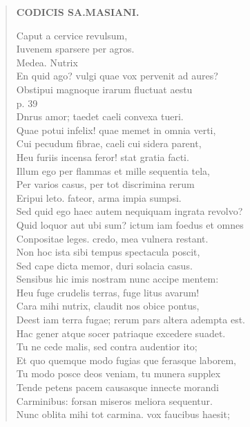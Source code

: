 \documentclass[11pt, a4paper]{report}
\begin{document}
\begin{verse}
    \begin{center} \textbf{CODICIS SA.MASIANI.} \end{center} \marginpar{[67]} Caput a cervice revulsum, \\ Iuvenem sparsere per agros. \\ Medea. Nutrix \\ En quid ago? vulgi quae vox pervenit ad aures? \\ Obstipui magnoque irarum fluctuat aestu \\ p. 39 \\ Dnrus amor; taedet caeli convexa tueri. \\ Quae potui infelix! quae memet in omnia verti, \\ Cui pecudum fibrae, caeli cui sidera parent, \\ Heu furiis incensa feror! stat gratia facti. \\ Illum ego per flammas et mille sequentia tela, \\ Per varios casus, per tot discrimina rerum \\ Eripui leto. fateor, arma impia sumpsi. \\ Sed quid ego haec autem nequiquam ingrata revolvo? \\ Quid loquor aut ubi sum? ictum iam foedus et omnes \\ Conpositae leges. credo, mea vulnera restant. \\ Non hoc ista sibi tempus spectacula poscit, \\ Sed cape dicta memor, duri solacia casus. \\ Sensibus hic imis nostram nunc accipe mentem: \\ Heu fuge crudelis terras, fuge litus avarum! \\ Cara mihi nutrix, claudit nos obice pontus, \\ Deest iam terra fugae; rerum pars altera adempta est. \\ Hac gener atque socer patriaque excedere suadet. \\ Tu ne cede malis, sed contra audentior ito; \\ Et quo quemque modo fugias \lbrack que \rbrack  ferasque laborem, \\ Tu modo posce deos veniam, tu munera supplex \\ Tende petens pacem causasque innecte morandi \\ Carminibus: forsan miseros meliora sequentur. \\ Nunc oblita mihi tot carmina. \rbrack  vox faucibus haesit; \\ 

\end{verse}
\end{document}
